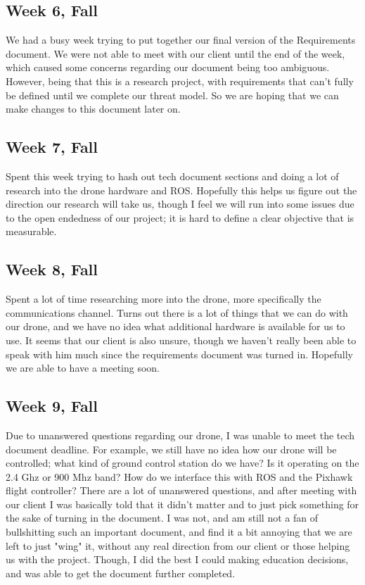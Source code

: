 \documentclass[IEEEtran,letterpaper,10pt,notitlepage,draftclsnofoot,onecolumn]{article}
\begin{document}
\subsection{Week 6, Fall}
We had a busy week trying to put together our final version of the Requirements document. We were not able to meet with our client until the end of the week, which caused some concerns regarding our document being too ambiguous. However, being that this is a research project, with requirements that can't fully be defined until we complete our threat model. So we are hoping that we can make changes to this document later on.
\subsection{Week 7, Fall}
Spent this week trying to hash out tech document sections and doing a lot of research into the drone hardware and ROS. Hopefully this helps us figure out the direction our research will take us, though I feel we will run into some issues due to the open endedness of our project; it is hard to define a clear objective that is measurable.
\subsection{Week 8, Fall}
Spent a lot of time researching more into the drone, more specifically the communications channel. Turns out there is a lot of things that we can do with our drone, and we have no idea what additional hardware is available for us to use. It seems that our client is also unsure, though we haven't really been able to speak with him much since the requirements document was turned in. Hopefully we are able to have a meeting soon.
\subsection{Week 9, Fall}
Due to unanswered questions regarding our drone, I was unable to meet the tech document deadline. For example, we still have no idea how our drone will be controlled; what kind of ground control station do we have? Is it operating on the 2.4 Ghz or 900 Mhz band? How do we interface this with ROS and the Pixhawk flight controller? There are a lot of unanswered questions, and after meeting with our client I was basically told that it didn't matter and to just pick something for the sake of turning in the document. I was not, and am still not a fan of bullshitting such an important document, and find it a bit annoying that we are left to just "wing" it, without any real direction from our client or those helping us with the project. Though, I did the best I could making education decisions, and was able to get the document further completed.
\end{document}
